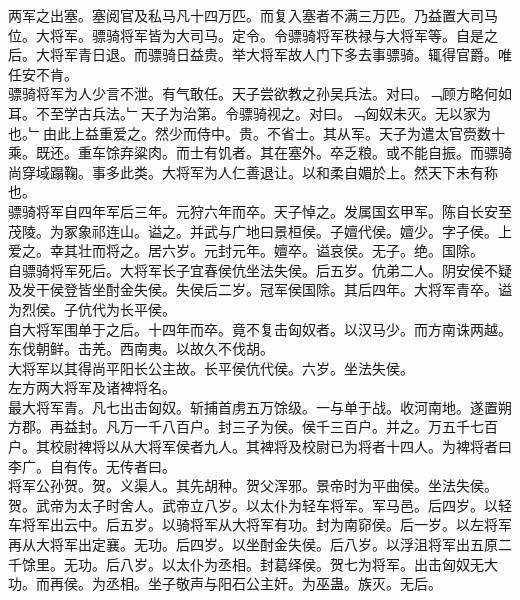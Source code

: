 \documentclass{zhvt-classic}
\begin{document}
\hspace*{2em}两军之出塞。塞阅官及私马凡十四万匹。而复入塞者不满三万匹。乃益置大司马位。大将军。骠骑将军皆为大司马。定令。令骠骑将军秩禄与大将军等。自是之后。大将军青日退。而骠骑日益贵。举大将军故人门下多去事骠骑。辄得官爵。唯任安不肯。\\
\hspace*{2em}骠骑将军为人少言不泄。有气敢任。天子尝欲教之孙吴兵法。对曰。﹁顾方略何如耳。不至学古兵法。﹂天子为治第。令骠骑视之。对曰。﹁匈奴未灭。无以家为也。﹂由此上益重爱之。然少而侍中。贵。不省士。其从军。天子为遣太官赍数十乘。既还。重车馀弃粱肉。而士有饥者。其在塞外。卒乏粮。或不能自振。而骠骑尚穿域蹋鞠。事多此类。大将军为人仁善退让。以和柔自媚於上。然天下未有称也。\\
\hspace*{2em}骠骑将军自四年军后三年。元狩六年而卒。天子悼之。发属国玄甲军。陈自长安至茂陵。为冢象祁连山。谥之。并武与广地曰景桓侯。子嬗代侯。嬗少。字子侯。上爱之。幸其壮而将之。居六岁。元封元年。嬗卒。谥哀侯。无子。绝。国除。\\
\hspace*{2em}自骠骑将军死后。大将军长子宜春侯伉坐法失侯。后五岁。伉弟二人。阴安侯不疑及发干侯登皆坐酎金失侯。失侯后二岁。冠军侯国除。其后四年。大将军青卒。谥为烈侯。子伉代为长平侯。\\
\hspace*{2em}自大将军围单于之后。十四年而卒。竟不复击匈奴者。以汉马少。而方南诛两越。东伐朝鲜。击羌。西南夷。以故久不伐胡。\\
\hspace*{2em}大将军以其得尚平阳长公主故。长平侯伉代侯。六岁。坐法失侯。\\
\hspace*{2em}左方两大将军及诸裨将名。\\
\hspace*{2em}最大将军青。凡七出击匈奴。斩捕首虏五万馀级。一与单于战。收河南地。遂置朔方郡。再益封。凡万一千八百户。封三子为侯。侯千三百户。并之。万五千七百户。其校尉裨将以从大将军侯者九人。其裨将及校尉已为将者十四人。为裨将者曰李广。自有传。无传者曰。\\
\hspace*{2em}将军公孙贺。贺。义渠人。其先胡种。贺父浑邪。景帝时为平曲侯。坐法失侯。贺。武帝为太子时舍人。武帝立八岁。以太仆为轻车将军。军马邑。后四岁。以轻车将军出云中。后五岁。以骑将军从大将军有功。封为南窌侯。后一岁。以左将军再从大将军出定襄。无功。后四岁。以坐酎金失侯。后八岁。以浮沮将军出五原二千馀里。无功。后八岁。以太仆为丞相。封葛绎侯。贺七为将军。出击匈奴无大功。而再侯。为丞相。坐子敬声与阳石公主奸。为巫蛊。族灭。无后。\\
\end{document}
